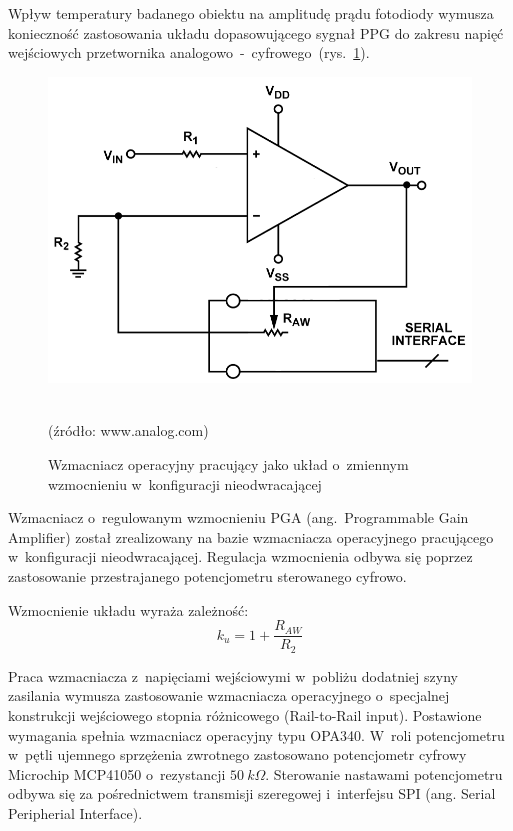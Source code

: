 Wpływ temperatury badanego obiektu na amplitudę prądu fotodiody wymusza konieczność zastosowania układu dopasowującego sygnał PPG do zakresu
napięć wejściowych przetwornika analogowo~-~cyfrowego~(rys.~\ref{rys:PGA}).  
\begin{figure}[ht]
	\centerline{\includegraphics[scale = 0.3]{graphic/PGA}}
	\caption{Wzmacniacz operacyjny pracujący jako układ o~zmiennym wzmocnieniu w~konfiguracji nieodwracającej}
	~\\
	(źródło: www.analog.com)
	\label{rys:PGA}
\end{figure}

Wzmacniacz o~regulowanym wzmocnieniu PGA (ang.~Programmable Gain Amplifier) został zrealizowany na bazie wzmacniacza operacyjnego pracującego 
w~konfiguracji nieodwracającej. Regulacja wzmocnienia odbywa się poprzez zastosowanie przestrajanego potencjometru sterowanego cyfrowo.

Wzmocnienie układu wyraża zależność:
\begin{equation}
\label{equ:AMP}
	k_{u} = 1 + \frac{R_{AW}}{R_{2}} 	
\end{equation}

Praca wzmacniacza z~napięciami wejściowymi w~pobliżu dodatniej szyny zasilania wymusza zastosowanie wzmacniacza operacyjnego o~specjalnej konstrukcji
wejściowego stopnia różnicowego (Rail-to-Rail input). Postawione wymagania spełnia wzmacniacz operacyjny typu OPA340. W~roli potencjometru w~pętli 
ujemnego sprzężenia zwrotnego zastosowano potencjometr cyfrowy Microchip MCP41050 o~rezystancji $50~k\Omega$. Sterowanie nastawami potencjometru odbywa
się za pośrednictwem transmisji szeregowej i~interfejsu SPI (ang. Serial Peripherial Interface).

